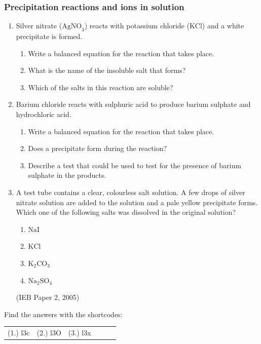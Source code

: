             \subsubsection{ Precipitation reactions and ions in solution }
            \nopagebreak
            \label{m38719*id341939}\begin{enumerate}[noitemsep, label=\textbf{\arabic*}. ] 
            \label{m38719*uid74}\item Silver nitrate (${\mathrm{AgNO}}_{3}$) reacts with potassium chloride ($\mathrm{KCl}$) and a white precipitate is formed.
\label{m38719*id341969}\begin{enumerate}[noitemsep, label=\textbf{\alph*}. ] 
            \label{m38719*uid75}\item Write a balanced equation for the reaction that takes place.
\label{m38719*uid76}\item What is the name of the insoluble salt that forms?
\label{m38719*uid77}\item Which of the salts in this reaction are soluble?
\end{enumerate}
\label{m38719*uid78}\item Barium chloride reacts with sulphuric acid to produce barium sulphate and hydrochloric acid.
\label{m38719*id342022}\begin{enumerate}[noitemsep, label=\textbf{\alph*}. ] 
            \label{m38719*uid79}\item Write a balanced equation for the reaction that takes place.
\label{m38719*uid80}\item Does a precipitate form during the reaction?
\label{m38719*uid81}\item Describe a test that could be used to test for the presence of barium sulphate in the products.
\end{enumerate}
\label{m38719*uid82}\item A test tube contains a clear, colourless salt solution. A few drops of silver nitrate solution are added to the solution and a pale yellow precipitate forms. Which one of the following salts was dissolved in the original solution?
\label{m38719*id342078}\begin{enumerate}[noitemsep, label=\textbf{\alph*}. ] 
            \label{m38719*uid83}\item $\mathrm{NaI}$
\label{m38719*uid84}\item $\mathrm{KCl}$
\label{m38719*uid85}\item ${\mathrm{K}}_{2}{\mathrm{CO}}_{3}$\label{m38719*uid86}\item ${\mathrm{Na}}_{2}{\mathrm{SO}}_{4}$\end{enumerate}
(IEB Paper 2, 2005)\newline
\end{enumerate}
    \label{m38719*fs-id1165446821271}
\par {} Find the answers with the shortcodes:
 \par \begin{tabular}[h]{cccccc}
 (1.) l3c  &  (2.) l3O  &  (3.) l3x  & \end{tabular}
